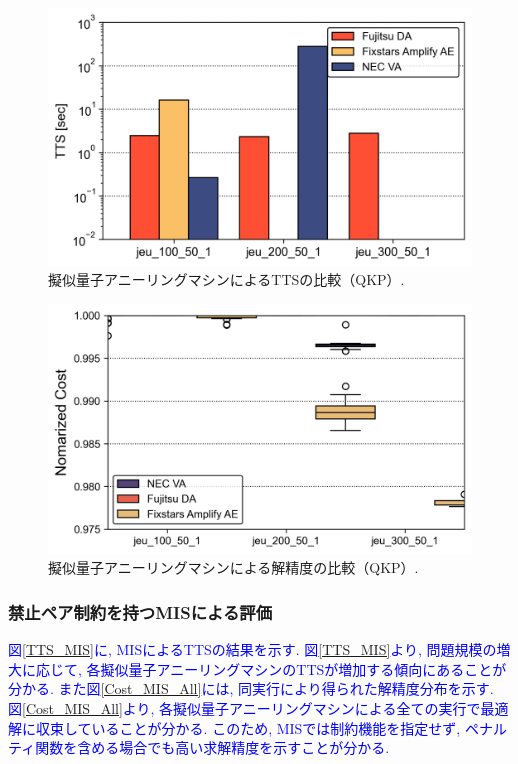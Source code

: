 \documentclass[submit,techrep,noauthor]{ipsj}
\begin{document}
\begin{figure}[ht]
\centering
\includegraphics[bb=0 0 700 250, width=15cm]{TTS_QKP.png}
\caption{擬似量子アニーリングマシンによるTTSの比較（QKP）.}
\label{TTS_QKP}
\end{figure}

\begin{figure}[ht]
\centering
\includegraphics[bb=0 0 700 250, width=15cm]{Cost_QKP_All.png}
\caption{擬似量子アニーリングマシンによる解精度の比較（QKP）.}
\label{Cost_QKP_All}
\end{figure}

\subsubsection{禁止ペア制約を持つMISによる評価}
\textcolor{blue}{図\ref{TTS_MIS}に, MISによるTTSの結果を示す. 図\ref{TTS_MIS}より, 問題規模の増大に応じて, 各擬似量子アニーリングマシンのTTSが増加する傾向にあることが分かる. また図\ref{Cost_MIS_All}には, 同実行により得られた解精度分布を示す. 図\ref{Cost_MIS_All}より, 各擬似量子アニーリングマシンによる全ての実行で最適解に収束していることが分かる. このため, MISでは制約機能を指定せず, ペナルティ関数を含める場合でも高い求解精度を示すことが分かる.}
\end{document}
